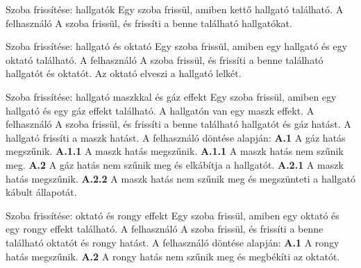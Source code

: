 \begin{use-case}
    {Szoba frissítése: hallgatók}
    {Egy szoba frissül, amiben kettő hallgató található.}
    {A felhasználó}
    A szoba frissül, és frissíti a benne található hallgatókat.
\end{use-case}

\begin{use-case}
    {Szoba frissítése: hallgató és oktató}
    {Egy szoba frissül, amiben egy hallgató és egy oktató található.}
    {A felhasználó}
    A szoba frissül, és frissíti a benne található hallgatót és oktatót. Az oktató elveszi a hallgató lelkét.
\end{use-case}

\begin{use-case}
    {Szoba frissítése: hallgató maszkkal és gáz effekt}
    {Egy szoba frissül, amiben egy hallgató és egy gáz effekt található. A hallgatón van egy maszk effekt.}
    {A felhasználó}
    A szoba frissül, és frissíti a benne található hallgatót és gáz hatást. A hallgató frissíti a maszk hatást. A felhasználó döntése alapján:
    \newline \textbf{A.1} A gáz hatás megszűnik.
    \newline    \textbf{A.1.1} A maszk hatás megszűnik.
    \newline    \textbf{A.1.1} A maszk hatás nem szűnik meg.
    \newline \textbf{A.2} A gáz hatás nem szűnik meg és elkábítja a hallgatót.
    \newline    \textbf{A.2.1} A maszk hatás megszűnik.
    \newline    \textbf{A.2.2} A maszk hatás nem szűnik meg és megszünteti a hallgató kábult állapotát.
\end{use-case}

\begin{use-case}
    {Szoba frissítése: oktató és rongy effekt}
    {Egy szoba frissül, amiben egy oktató és egy rongy effekt található.}
    {A felhasználó}
    A szoba frissül, és frissíti a benne található oktatót és rongy hatást. A felhasználó döntése alapján:
    \newline \textbf{A.1} A rongy hatás megszűnik.
    \newline \textbf{A.2} A rongy hatás nem szűnik meg és megbékíti az oktatót.
\end{use-case}
\clearpage
